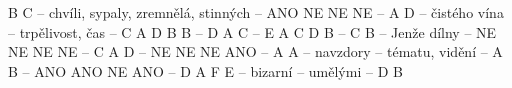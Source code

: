 \documentclass{article}
\begin{document}
\fontsize{8pt}{10pt}\selectfont\setlength\parindent{0em}
\vspace*{\fill}
B C -- chvíli, sypaly, zremnělá, stinných -- ANO NE NE NE -- A D -- čistého vína -- trpělivost, čas -- C A D B B -- D A C -- E A C D B -- C B -- Jenže dílny -- NE NE NE NE -- C A D -- NE NE NE ANO -- A A -- navzdory -- tématu, vidění -- A B -- ANO ANO NE ANO -- D A F E -- bizarní -- umělými -- D B
\end{document}
